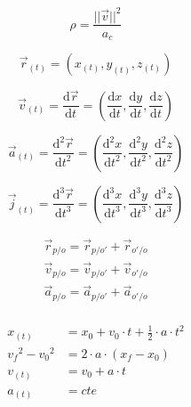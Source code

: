     \begin{equation}\label{eq:radio_circ_obs}
    \rho = \frac{||\vec{v}||^2}{a_c}
    \end{equation}
    
    \begin{equation}
        \vec{r}_{(t)}= (x_{(t)},y_{(t)},z_{(t)})
    \end{equation}
    
    \begin{equation}
        \vec{v}_{(t)} = \frac{\mathrm{d} \vec{r}}{\mathrm{d} t} = \left(
         \frac{\mathrm{d}x}{\mathrm{d} t},
         \frac{\mathrm{d}y}{\mathrm{d} t},
         \frac{\mathrm{d}z}{\mathrm{d} t}
        \right)
    \end{equation}
    
    \null
    \begin{equation}
        \vec{a}_{(t)} = \frac{\mathrm{d^2} \vec{r}}{\mathrm{d} t^2} = \left(
         \frac{\mathrm{d^2}x}{\mathrm{d} t^2},
         \frac{\mathrm{d^2}y}{\mathrm{d} t^2},
         \frac{\mathrm{d^2}z}{\mathrm{d} t^2}
        \right)
    \end{equation}
    
    \begin{equation}
        \vec{j}_{(t)} = \frac{\mathrm{d^3} \vec{r}}{\mathrm{d} t^3} = \left(
         \frac{\mathrm{d^3}x}{\mathrm{d} t^3},
         \frac{\mathrm{d^3}y}{\mathrm{d} t^3},
         \frac{\mathrm{d^3}z}{\mathrm{d} t^3}
        \right)
    \end{equation}
    
    \begin{equation}
    \begin{split}
        \vec{r}_{p/o} = \vec{r}_{p/o'} + \vec{r}_{o'/o}\\
        \vec{v}_{p/o} = \vec{v}_{p/o'} + \vec{v}_{o'/o}\\
        \vec{a}_{p/o} = \vec{a}_{p/o'} + \vec{a}_{o'/o}\\
    \end{split}
    \end{equation}
    
    \begin{equation}
    \begin{split}
        x_{(t)}&= x_{0} + v_{0} \cdot t + \frac{1}{2} \cdot a \cdot t^2\\
        {v_{f}}^2-{v_{0}}^2 &= 2 \cdot a \cdot ({x_{f}} - {x_{0}})\\
        v_{(t)}&= v_{0} + a \cdot t\\
        a_{(t)}&= cte\\
    \end{split}
    \end{equation}
    